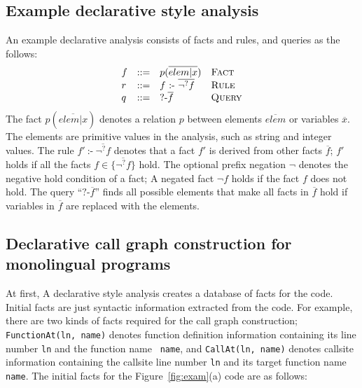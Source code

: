 \subsection{Example declarative style analysis}
An example declarative analysis consists of facts and rules, and queries as the
follows:
\[
  \begin{array}{llll}
    f & ::= & p(\overline{elem | x}) & \text{\sc Fact}\\
    r & ::= & f\ \mbox{:-}\ \overline{\neg^? f} & \text{\sc Rule}\\
    q & ::= & \mbox{?-} \overline{f}\ &  \text{\sc Query}
\end{array}
\]
The fact $p(\overline{elem | x})$ denotes a relation $p$ between elements
$\overline{elem}$ or variables $\overline{x}$. The elements are primitive
values in the analysis, such as string and integer values.  The rule $f'\
\mbox{:-}\ \overline{\neg^? f}$ denotes that a fact $f'$ is derived from other
facts $\overline{f}$; $f'$ holds if all the facts $f \in \{\overline{\neg^?
f}\}$ hold. The optional prefix negation $\neg$ denotes the negative hold
condition of a fact; A negated fact $\neg f$ holds if the fact $f$ does not
hold. The query ``$\mbox{?-} \overline{f}$'' finds all possible elements that
make all facts in $\overline{f}$ hold if variables in $\overline{f}$ are
replaced with the elements.


\subsection{Declarative call graph construction for monolingual programs}\label{lab:ovmono}

\lstset{
  basicstyle=\ttfamily,
  columns=fullflexible,
  keepspaces=true,
  mathescape
}

At first, A declarative style analysis creates a database of facts for the
code. Initial facts are just syntactic information extracted from the code.
For example, there are two kinds of facts required for the call graph
construction; {\tt FunctionAt(ln, name)} denotes function definition
information containing its line number {\tt ln} and the function name {\tt
name}, and {\tt CallAt(ln, name)} denotes callsite information
containing the callsite line number {\tt ln} and its target function name {\tt
name}. The initial facts for the Figure~\ref{fig:exam}(a) code are as follows: 


